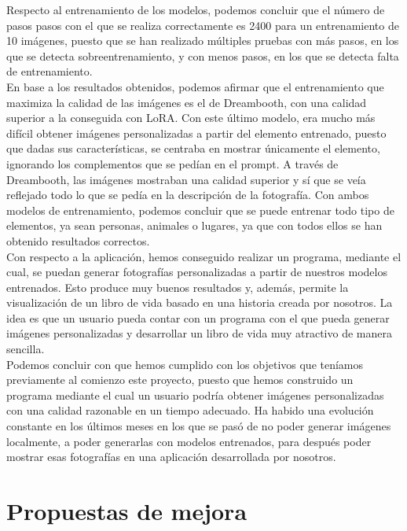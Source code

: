 Respecto al entrenamiento de los modelos, podemos concluir que el número de pasos pasos con el que se realiza correctamente es 2400 para un entrenamiento de 10 imágenes, puesto que se han realizado múltiples pruebas con más pasos, en los que se detecta sobreentrenamiento, y con menos pasos, en los que se detecta falta de entrenamiento.\\

En base a los resultados obtenidos, podemos afirmar que el entrenamiento que maximiza la calidad de las imágenes es el de Dreambooth, con una calidad superior a la conseguida con LoRA. Con este último modelo, era mucho más difícil obtener imágenes personalizadas a partir del elemento entrenado, puesto que dadas sus características, se centraba en mostrar únicamente el elemento, ignorando los complementos que se pedían en el prompt. A través de Dreambooth, las imágenes mostraban una calidad superior y sí que se veía reflejado todo lo que se pedía en la descripción de la fotografía. Con ambos modelos de entrenamiento, podemos concluir que se puede entrenar todo tipo de elementos, ya sean personas, animales o lugares, ya que con todos ellos se han obtenido resultados correctos.\\

Con respecto a la aplicación, hemos conseguido realizar un programa, mediante el cual, se puedan generar fotografías personalizadas a partir de nuestros modelos entrenados. Esto produce muy buenos resultados y, además, permite la visualización de un libro de vida basado en una historia creada por nosotros. La idea es que un usuario pueda contar con un programa con el que pueda generar imágenes personalizadas y desarrollar un libro de vida muy atractivo de manera sencilla.\\

Podemos concluir con que hemos cumplido con los objetivos que teníamos previamente al comienzo este proyecto, puesto que hemos construido un programa mediante el cual un usuario podría obtener imágenes personalizadas con una calidad razonable en un tiempo adecuado. Ha habido una evolución constante en los últimos meses en los que se pasó de no poder generar imágenes localmente, a poder generarlas con modelos entrenados, para después poder mostrar esas fotografías en una aplicación desarrollada por nosotros.\\

\section{Propuestas de mejora}

